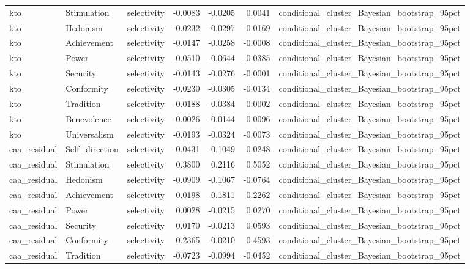 \begin{tabular}{lllrrrl}
kto & Stimulation & selectivity & -0.0083 & -0.0205 & 0.0041 & conditional\_cluster\_Bayesian\_bootstrap\_95pct \\
kto & Hedonism & selectivity & -0.0232 & -0.0297 & -0.0169 & conditional\_cluster\_Bayesian\_bootstrap\_95pct \\
kto & Achievement & selectivity & -0.0147 & -0.0258 & -0.0008 & conditional\_cluster\_Bayesian\_bootstrap\_95pct \\
kto & Power & selectivity & -0.0510 & -0.0644 & -0.0385 & conditional\_cluster\_Bayesian\_bootstrap\_95pct \\
kto & Security & selectivity & -0.0143 & -0.0276 & -0.0001 & conditional\_cluster\_Bayesian\_bootstrap\_95pct \\
kto & Conformity & selectivity & -0.0230 & -0.0305 & -0.0134 & conditional\_cluster\_Bayesian\_bootstrap\_95pct \\
kto & Tradition & selectivity & -0.0188 & -0.0384 & 0.0002 & conditional\_cluster\_Bayesian\_bootstrap\_95pct \\
kto & Benevolence & selectivity & -0.0026 & -0.0144 & 0.0096 & conditional\_cluster\_Bayesian\_bootstrap\_95pct \\
kto & Universalism & selectivity & -0.0193 & -0.0324 & -0.0073 & conditional\_cluster\_Bayesian\_bootstrap\_95pct \\
caa\_residual & Self\_direction & selectivity & -0.0431 & -0.1049 & 0.0248 & conditional\_cluster\_Bayesian\_bootstrap\_95pct \\
caa\_residual & Stimulation & selectivity & 0.3800 & 0.2116 & 0.5052 & conditional\_cluster\_Bayesian\_bootstrap\_95pct \\
caa\_residual & Hedonism & selectivity & -0.0909 & -0.1067 & -0.0764 & conditional\_cluster\_Bayesian\_bootstrap\_95pct \\
caa\_residual & Achievement & selectivity & 0.0198 & -0.1811 & 0.2262 & conditional\_cluster\_Bayesian\_bootstrap\_95pct \\
caa\_residual & Power & selectivity & 0.0028 & -0.0215 & 0.0270 & conditional\_cluster\_Bayesian\_bootstrap\_95pct \\
caa\_residual & Security & selectivity & 0.0170 & -0.0213 & 0.0593 & conditional\_cluster\_Bayesian\_bootstrap\_95pct \\
caa\_residual & Conformity & selectivity & 0.2365 & -0.0210 & 0.4593 & conditional\_cluster\_Bayesian\_bootstrap\_95pct \\
caa\_residual & Tradition & selectivity & -0.0723 & -0.0994 & -0.0452 & conditional\_cluster\_Bayesian\_bootstrap\_95pct \\

\end{tabular}
